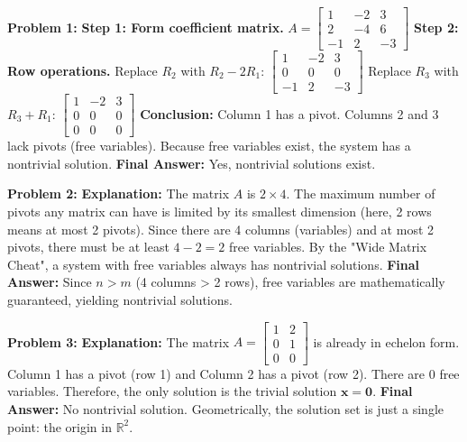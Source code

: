 \documentclass[12pt]{article}
\begin{document}
\textbf{Problem 1:}
\textbf{Step 1: Form coefficient matrix.}
$A = \begin{bmatrix} 1 & -2 & 3 \\ 2 & -4 & 6 \\ -1 & 2 & -3 \end{bmatrix}$
\textbf{Step 2: Row operations.}
Replace $R_2$ with $R_2 - 2R_1$: $\begin{bmatrix} 1 & -2 & 3 \\ 0 & 0 & 0 \\ -1 & 2 & -3 \end{bmatrix}$
Replace $R_3$ with $R_3 + R_1$: $\begin{bmatrix} 1 & -2 & 3 \\ 0 & 0 & 0 \\ 0 & 0 & 0 \end{bmatrix}$
\textbf{Conclusion:} Column 1 has a pivot. Columns 2 and 3 lack pivots (free variables). Because free variables exist, the system has a nontrivial solution.
\textbf{Final Answer:} Yes, nontrivial solutions exist.

\textbf{Problem 2:}
\textbf{Explanation:} The matrix $A$ is $2 \times 4$. The maximum number of pivots any matrix can have is limited by its smallest dimension (here, 2 rows means at most 2 pivots). Since there are 4 columns (variables) and at most 2 pivots, there must be at least $4 - 2 = 2$ free variables. By the "Wide Matrix Cheat", a system with free variables always has nontrivial solutions.
\textbf{Final Answer:} Since $n > m$ (4 columns > 2 rows), free variables are mathematically guaranteed, yielding nontrivial solutions.

\textbf{Problem 3:}
\textbf{Explanation:} The matrix $A = \begin{bmatrix} 1 & 2 \\ 0 & 1 \\ 0 & 0 \end{bmatrix}$ is already in echelon form. Column 1 has a pivot (row 1) and Column 2 has a pivot (row 2). There are 0 free variables. Therefore, the only solution is the trivial solution $\mathbf{x} = \mathbf{0}$.
\textbf{Final Answer:} No nontrivial solution. Geometrically, the solution set is just a single point: the origin in $\mathbb{R}^2$.
\end{document}
